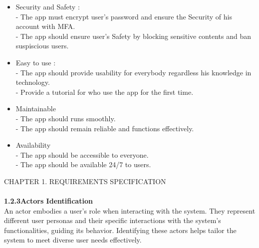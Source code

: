 \documentclass{article}
\begin{document}
\begin{itemize}[label=$\bullet$]
	\item Security and Safety :\vspace{0.1cm}
\\- The app must encrypt user's password and ensure the Security of his account with MFA.
\\- The app should ensure user's Safety by blocking sensitive contents and ban suspiscious users.
	\item Easy to use : \vspace{0.1cm}
\\- The app should provide usability for everybody regardless his knowledge in technology.
\\- Provide a tutorial for who use the app for the first time.
	\item Maintainable\vspace{0.1cm}
\\- The app should runs smoothly.
\\- The app should remain reliable and functions effectively.
	\item Availability\vspace{0.1cm}
\\- The app should be accessible to everyone.
\\- The app should be available  24/7 to users.
\end{itemize}
\newpage
\noindent
CHAPTER 1.  REQUIREMENTS SPECIFICATION \\
\underline{\hspace{\textwidth}} \vspace{0.2cm}\\
{\large \textbf{1.2.3\hspace{1em}Actors Identification}}\vspace{0.2cm}
\\An actor embodies a user's role when interacting with the system. They represent different user personas and their specific interactions with the system's functionalities, guiding its behavior. Identifying these actors helps tailor the system to meet diverse user needs effectively.\vspace{0.8cm}
\end{document}
